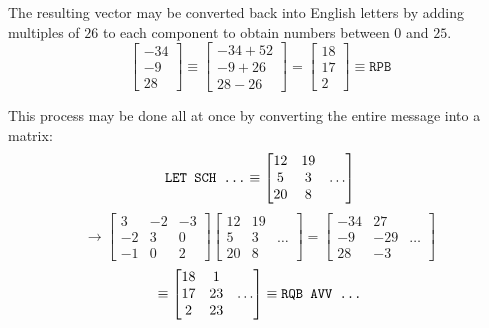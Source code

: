 \begin{applicationActivities}
\begin{remark}
The resulting vector may be converted back into English letters by
adding multiples of \(26\) to each component to obtain numbers between
\(0\) and \(25\).
\[
\begin{bmatrix}-34\\-9\\28\end{bmatrix}
\equiv
\begin{bmatrix}-34+52\\-9+26\\28-26\end{bmatrix}
=
\begin{bmatrix}18\\17\\2\end{bmatrix}
\equiv
\mathtt{RPB}
\]
\end{remark}

\begin{observation}
This process may be done all at once by converting the entire message into a matrix:
\[
\text{\texttt{LET SCH ...}}
\equiv
\begin{bmatrix}12&19\\5&3&\dots\\20&8\end{bmatrix}
\]
\[
\to
\begin{bmatrix}3&-2&-3\\-2&3&0\\-1&0&2\end{bmatrix}\begin{bmatrix}12&19\\5&3&\dots\\20&8\end{bmatrix}=
\begin{bmatrix}-34&27\\-9&-29&\dots\\28&-3\end{bmatrix}
\]
\[
\equiv
\begin{bmatrix}18&1\\17&23&\dots\\2&23\end{bmatrix}
\equiv
\text{\texttt{RQB AVV ...}}
\]
\end{observation}


\end{applicationActivities}
